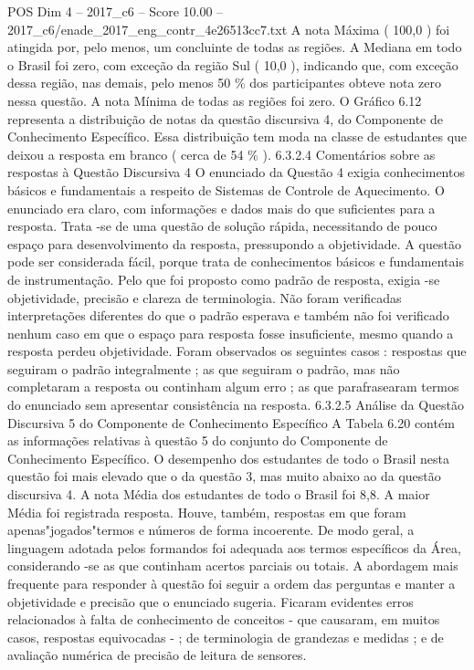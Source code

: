 \begin{textsample}{POS Dim 4 – 2017\_c6 – Score 10.00 – 2017\_c6/enade\_2017\_eng\_contr\_4e26513cc7.txt}
A nota Máxima ( 100,0 ) foi atingida por, pelo menos, um concluinte de todas as regiões.
A Mediana em todo o Brasil foi zero, com exceção da região Sul ( 10,0 ), indicando que, com exceção dessa região, nas demais, pelo menos 50 \% dos participantes obteve nota zero nessa questão.
A nota Mínima de todas as regiões foi zero.
O Gráfico 6.12 representa a distribuição de notas da questão discursiva 4, do Componente de Conhecimento Específico.
Essa distribuição tem moda na classe de estudantes que deixou a resposta em branco ( cerca de 54 \% ). 6.3.2.4 Comentários sobre as respostas à Questão Discursiva 4 O enunciado da Questão 4 exigia conhecimentos básicos e fundamentais a respeito de Sistemas de Controle de Aquecimento.
O enunciado era claro, com informações e dados mais do que suficientes para a resposta.
Trata -se de uma questão de solução rápida, necessitando de pouco espaço para desenvolvimento da resposta, pressupondo a objetividade.
A questão pode ser considerada fácil, porque trata de conhecimentos básicos e fundamentais de instrumentação.
Pelo que foi proposto como padrão de resposta, exigia -se objetividade, precisão e clareza de terminologia.
Não foram verificadas interpretações diferentes do que o padrão esperava e também não foi verificado nenhum caso em que o espaço para resposta fosse insuficiente, mesmo quando a resposta perdeu objetividade.
Foram observados os seguintes casos : respostas que seguiram o padrão integralmente ; as que seguiram o padrão, mas não completaram a resposta ou continham algum erro ; as que parafrasearam termos do enunciado sem apresentar consistência na resposta. 6.3.2.5 Análise da Questão Discursiva 5 do Componente de Conhecimento Específico A Tabela 6.20 contém as informações relativas à questão 5 do conjunto do Componente de Conhecimento Específico.
O desempenho dos estudantes de todo o Brasil nesta questão foi mais elevado que o da questão 3, mas muito abaixo ao da questão discursiva 4.
A nota Média dos estudantes de todo o Brasil foi 8,8.
A maior Média foi registrada resposta.
Houve, também, respostas em que foram apenas"jogados"termos e números de forma incoerente.
De modo geral, a linguagem adotada pelos formandos foi adequada aos termos específicos da Área, considerando -se as que continham acertos parciais ou totais.
A abordagem mais frequente para responder à questão foi seguir a ordem das perguntas e manter a objetividade e precisão que o enunciado sugeria.
Ficaram evidentes erros relacionados à falta de conhecimento de conceitos - que causaram, em muitos casos, respostas equivocadas - ; de terminologia de grandezas e medidas ; e de avaliação numérica de precisão de leitura de sensores.

\end{textsample}

